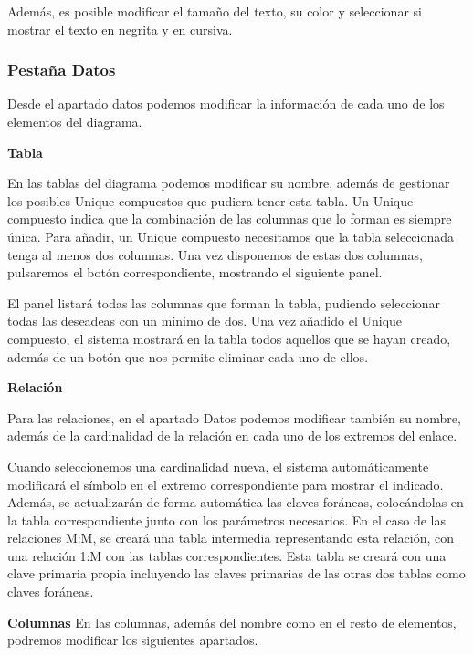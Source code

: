 Además, es posible modificar el tamaño del texto, su color y seleccionar si mostrar el texto en negrita y en cursiva.

\subsubsection{Pestaña Datos}
Desde el apartado datos podemos modificar la información de cada uno de los elementos del diagrama.

\textbf{Tabla}

En las tablas del diagrama podemos modificar su nombre, además de gestionar los posibles Unique compuestos que pudiera tener esta tabla. Un Unique compuesto indica que la combinación de las columnas que lo forman es siempre única. Para añadir, un Unique compuesto necesitamos que la tabla seleccionada tenga al menos dos columnas. Una vez disponemos de estas dos columnas, pulsaremos el botón correspondiente, mostrando el siguiente panel.


El panel listará todas las columnas que forman la tabla, pudiendo seleccionar todas las deseadeas con un mínimo de dos. Una vez añadido el Unique compuesto, el sistema mostrará en la tabla todos aquellos que se hayan creado, además de un botón que nos permite eliminar cada uno de ellos.

\textbf{Relación}

Para las relaciones, en el apartado Datos podemos modificar también su nombre, además de la cardinalidad de la relación en cada uno de los extremos del enlace.


Cuando seleccionemos una cardinalidad nueva, el sistema automáticamente modificará el símbolo en el extremo correspondiente para mostrar el indicado. Además, se actualizarán de forma automática las claves foráneas, colocándolas en la tabla correspondiente junto con los parámetros necesarios. En el caso de las relaciones M:M, se creará una tabla intermedia representando esta relación, con una relación 1:M con las tablas correspondientes. Esta tabla se creará con una clave primaria propia incluyendo las claves primarias de las otras dos tablas como claves foráneas.

\textbf{Columnas}
En las columnas, además del nombre como en el resto de elementos, podremos modificar los siguientes apartados.


